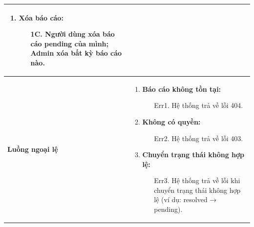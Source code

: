 {\begin{tabularx}{\textwidth}{|>{\raggedright\arraybackslash}p{3.5cm}|>{\raggedright\arraybackslash}X|}
\begin{enumerate}
\begin{enumerate}
    \end{enumerate}
    \item \textbf{Xóa báo cáo:}
    \begin{enumerate}
        \item[1C.] Người dùng xóa báo cáo pending của mình; Admin xóa bất kỳ báo cáo nào.
    \end{enumerate}
\end{enumerate} \\
\hline
\textbf{Luồng ngoại lệ} &
\begin{enumerate}
    \item \textbf{Báo cáo không tồn tại:}
    \begin{enumerate}
        \item[Err1.] Hệ thống trả về lỗi 404.
    \end{enumerate}
    \item \textbf{Không có quyền:}
    \begin{enumerate}
        \item[Err2.] Hệ thống trả về lỗi 403.
    \end{enumerate}
    \item \textbf{Chuyển trạng thái không hợp lệ:}
    \begin{enumerate}
        \item[Err3.] Hệ thống trả về lỗi khi chuyển trạng thái không hợp lệ (ví dụ: resolved → pending).
    \end{enumerate}
\end{enumerate} \\
\hline
\end{tabularx}
}
